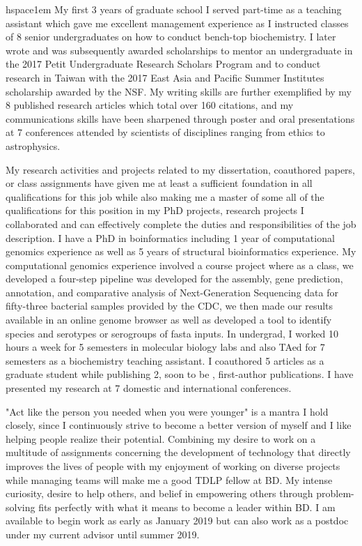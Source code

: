 hspace{1em} My first 3 years of graduate school I served part-time as a teaching assistant which gave me excellent management experience as I instructed classes of 8 senior undergraduates on how to conduct bench-top biochemistry. I later wrote and was subsequently awarded scholarships to mentor an undergraduate in the 2017 Petit Undergraduate Research Scholars Program and to conduct research in Taiwan with the 2017 East Asia and Pacific Summer Institutes scholarship awarded by the NSF. My writing skills are further exemplified by my 8 published research articles which total over 160 citations, and my communications skills have been sharpened through poster and oral presentations at 7 conferences attended by scientists of disciplines ranging from ethics to astrophysics.

My research activities and projects related to my dissertation, coauthored papers, or class assignments have given me at least a sufficient foundation in all qualifications for this job while also making me a master of some all of the qualifications for this position in my PhD projects, research projects I collaborated and can effectively complete the duties and responsibilities of the job description. I have a PhD in boinformatics including 1 year of computational genomics experience as well as 5 years of structural bioinformatics experience. My computational genomics experience involved a course project where as a class, we developed a four-step pipeline was developed for the assembly, gene prediction, annotation, and comparative analysis of Next-Generation Sequencing data for fifty-three bacterial samples provided by the CDC, we then made our results available in an online genome browser as well as developed a tool to identify species and serotypes or serogroups of fasta inputs. In undergrad, I worked 10 hours a week for 5 semesters in molecular biology labs and also TAed for 7 semesters as a biochemistry teaching assistant. I coauthored 5 articles as a graduate student while publishing 2, soon to be , first-author publications. I have presented my research at 7 domestic and international conferences.



"Act like the person you needed when you were younger" is a mantra I hold closely, since I continuously strive to become a better version of myself and I like helping people realize their potential. Combining my desire to work on a multitude of assignments concerning the development of technology that directly improves the lives of people with my enjoyment of working on diverse projects while managing teams will make me a good TDLP fellow at BD. My intense curiosity, desire to help others, and belief in empowering others through problem-solving fits perfectly with what it means to become a leader within BD. I am available to begin work as early as January 2019 but can also work as a postdoc under my current advisor until summer 2019.
